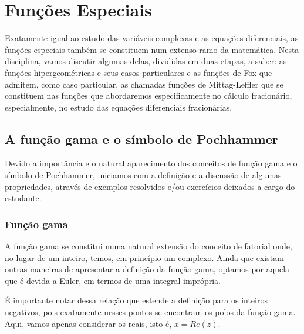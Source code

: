 
\chapter{Funções Especiais}

Exatamente igual ao estudo das variáveis complexas e as equações diferenciais, as funções especiais também se constituem num extenso ramo da matemática. Nesta disciplina, vamos discutir algumas delas, divididas em duas etapas, a saber: as funções hipergeométricas e seus casos particulares e as funções de Fox que admitem, como caso particular, as chamadas funções de Mittag-Leffler que se constituem nas funções que abordaremos especificamente no cálculo fracionário, especialmente, no estudo das equações diferenciais fracionárias.

\section{A função gama e o símbolo de Pochhammer}

Devido a importância e o natural aparecimento dos conceitos de função gama e o símbolo de Pochhammer, iniciamos com a definição e a discussão de algumas propriedades, através de exemplos resolvidos e/ou exercícios deixados a cargo do estudante.

\subsection{Função gama}

A função gama se constitui numa natural extensão do conceito de fatorial onde, no lugar de um inteiro, temos, em princípio um complexo. Ainda que existam outras maneiras de apresentar a definição da função gama, optamos por aquela que é devida a Euler, em termos de uma integral imprópria.



É importante notar dessa relação que estende a definição para os inteiros negativos, pois exatamente nesses pontos se encontram os polos da função gama. Aqui,
vamos apenas considerar os reais, isto é, $x = Re(z)$.



